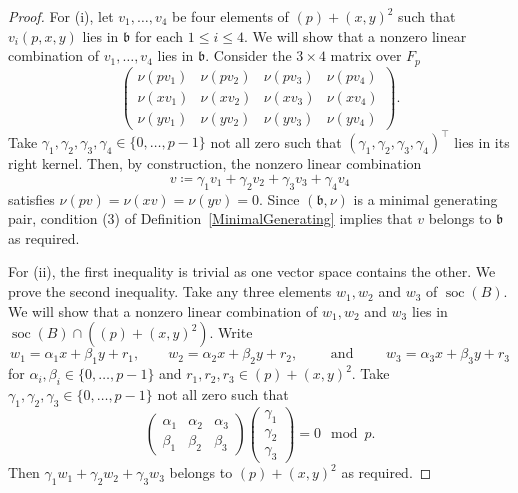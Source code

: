 \documentclass[11pt]{article}
\DeclareMathOperator{\soc}{soc}
\theoremstyle{definition}
\begin{document}
\begin{proof}
For (i), let $v_1,\ldots,v_4$ be four elements of $(p)+(x,y)^2$ such that $v_i(p,x,y)$ lies in $\mathfrak{b}$ for each $1\leq i\leq 4$. We will show that a nonzero linear combination of $v_1,\ldots,v_4$ lies in $\mathfrak{b}$. Consider the $3\times 4$ matrix over $F_p$
\[\begin{pmatrix}
\nu(pv_1)&\nu(pv_2)&\nu(pv_3)&\nu(pv_4)\\
\nu(xv_1)&\nu(xv_2)&\nu(xv_3)&\nu(xv_4)\\
\nu(yv_1)&\nu(yv_2)&\nu(yv_3)&\nu(yv_4)
\end{pmatrix}.\]
Take $\gamma_1,\gamma_2,\gamma_3,\gamma_4\in\lbrace 0,\ldots,p-1\rbrace$ not all zero such that $\left(\gamma_1,\gamma_2,\gamma_3,\gamma_4\right)^\top$ lies in its right kernel. Then, by construction, the nonzero linear combination
\[v\coloneqq\gamma_1 v_1+\gamma_2v_2+\gamma_3v_3+\gamma_4v_4\]
satisfies $\nu(pv)=\nu(xv)=\nu(yv)=0$. Since $\left(\mathfrak{b},\nu\right)$ is a minimal generating pair, condition (3) of Definition~\ref{MinimalGenerating} implies that $v$ belongs to $\mathfrak{b}$ as required.

For (ii), the first inequality is trivial as one vector space contains the other. We prove the second inequality. Take any three elements $w_1,w_2$ and $w_3$ of $\soc(B)$. We will show that a nonzero linear combination of $w_1,w_2$ and $w_3$ lies in $\soc(B)\cap\left((p)+(x,y)^2\right)$. Write
\[w_1=\alpha_1 x+\beta_1 y +r_1,\qquad w_2=\alpha_2 x+\beta_2 y +r_2,\qquad \text{ and }\qquad w_3=\alpha_3 x+\beta_3 y +r_3\]
for $\alpha_i,\beta_i\in\lbrace 0,\ldots,p-1\rbrace$ and $r_1,r_2,r_3\in (p)+(x,y)^2$. Take $\gamma_1,\gamma_2,\gamma_3\in\lbrace 0,\ldots,p-1\rbrace$ not all zero such that
\[\begin{pmatrix}
\alpha_1&\alpha_2&\alpha_3\\
\beta_1&\beta_2&\beta_3
\end{pmatrix}
\begin{pmatrix}
\gamma_1\\
\gamma_2\\
\gamma_3
\end{pmatrix}=0 \mod{p}.\]
Then $\gamma_1 w_1+\gamma_2 w_2+\gamma_3 w_3$ belongs to $(p)+(x,y)^2$ as required.


\end{proof}
\end{document}
